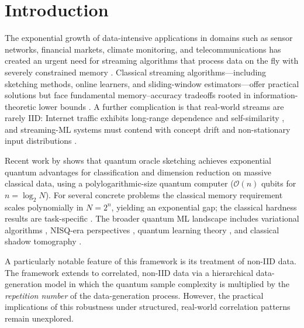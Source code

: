 \documentclass[preprint,12pt,authoryear]{elsarticle}
\newcommand{\bigO}{\mathcal{O}}
\begin{document}
\section{Introduction}
\label{sec:intro}

The exponential growth of data-intensive applications in domains such as sensor networks, financial markets, climate monitoring, and telecommunications has created an urgent need for streaming algorithms that process data on the fly with severely constrained memory \citep{muthukrishnan2005data}. Classical streaming algorithms---including sketching methods, online learners, and sliding-window estimators---offer practical solutions but face fundamental memory--accuracy tradeoffs rooted in information-theoretic lower bounds \citep{alon1999space}. A further complication is that real-world streams are rarely IID: Internet traffic exhibits long-range dependence and self-similarity \citep{leland1994ethernet, willinger1997selfsimilarity}, and streaming-ML systems must contend with concept drift and non-stationary input distributions \citep{gama2014driftsurvey, arora2024driftreview, su2024elasticonline, yan2024bidynamic}.

Recent work by \citet{zhao2026exponential} shows that quantum oracle sketching achieves exponential quantum advantages for classification and dimension reduction on massive classical data, using a polylogarithmic-size quantum computer ($\bigO(n)$ qubits for $n = \log_2 N$). For several concrete problems the classical memory requirement scales polynomially in $N = 2^n$, yielding an exponential gap; the classical hardness results are task-specific \citep{harrow2009hhl, havlicek2019qkernels, schuld2021encoding, biamonte2017qml}. The broader quantum ML landscape includes variational algorithms \citep{cerezo2021variational}, NISQ-era perspectives \citep{preskill2018nisq}, quantum learning theory \citep{schuld2018supervised}, and classical shadow tomography \citep{huang2020shadows}.

A particularly notable feature of this framework is its treatment of non\nobreakdash-IID data. The framework extends to correlated, non\nobreakdash-IID data via a hierarchical data-generation model in which the quantum sample complexity is multiplied by the \emph{repetition number} of the data-generation process. However, the practical implications of this robustness under structured, real-world correlation patterns remain unexplored.
\end{document}
